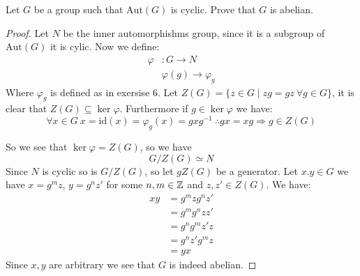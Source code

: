     \begin{exercise}
        Let $G$ be a group such that $\text{Aut}(G)$ is cyclic. Prove that $G$ is abelian.
        \begin{proof}
            Let $N$ be the inner automorphishms group, since it is a subgroup of $\text{Aut}(G)$ it is cylic. Now we define:\begin{align*}
                \varphi &\colon G\rightarrow N\\
                        &\varphi(g)\rightarrow \varphi_g
            \end{align*}
            Where $\varphi_g$ is defined as in exersise $6$. Let $Z(G) = \{z\in G \mid zg = gz \ \forall g\in G\}$, it is clear that $Z(G)\subseteq \ker \varphi$. Furthermore if $g\in \ker\varphi$ we have:\begin{equation*}
                \forall x\in G \ x = \text{id}(x) = \varphi_g(x) = gxg^{-1} \ \therefore gx = xg \Rightarrow g\in Z(G)
            \end{equation*}

            So we see that $\ker\varphi = Z(G)$, so we have \[G/Z(G)\simeq N\]
            Since $N$ is cyclic so is $G/Z(G)$, so let $gZ(G)$ be a generator. Let $x.y\in G$ we have $x = {g^m}z$, $y = {g^n}z'$ for some $n,m\in \mathbb{Z}$ and $z,z'\in Z(G)$. We have:\begin{align*}
                xy &= {g^m}z{g^n}z'\\
                    &= {g^m}{g^n}zz'\\
                    &= {g^n}{g^m}z'z\\
                    &=  {g^n}z'{g^m}z\\
                    &= yx
            \end{align*}
            Since $x,y$ are arbitrary we see that $G$ is indeed abelian.
        \end{proof}
    \end{exercise}

